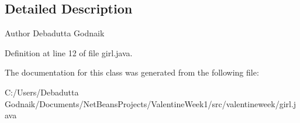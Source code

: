 \subsection{Detailed Description}
\begin{DoxyAuthor}{Author}
Debadutta Godnaik 
\end{DoxyAuthor}


Definition at line 12 of file girl.\+java.



The documentation for this class was generated from the following file\+:\begin{DoxyCompactItemize}
\item 
C\+:/\+Users/\+Debadutta Godnaik/\+Documents/\+Net\+Beans\+Projects/\+Valentine\+Week1/src/valentineweek/girl.\+java\end{DoxyCompactItemize}
